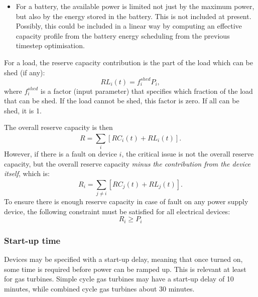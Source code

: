 \documentclass[12pt]{article}
\begin{document}
\begin{itemize}
\item \textcolor[HTML]{FF0000}{For a battery, the available power is limited not just by the maximum power, but also by the energy stored in the battery. This is not included at present. Possibly, this could be included in a linear way by computing an effective capacity profile from the battery energy scheduling from the previous timestep optimisation}.
\end{itemize}

For a load, the reserve capacity contribution is the part of the load which can be shed (if any):
\begin{equation}
	RL_{i} \left( t \right) = f_{i}^{shed}P_{i}, 
\end{equation}
where  \( f_{i}^{shed} \)  is a factor (input parameter) that specifies which fraction of the load that can be shed. 
If the load cannot be shed, this factor is zero. If all can be shed, it is 1.


The overall reserve capacity is then
\begin{equation}
	R=  \sum _{i}^{} \left[ RC_{i} \left( t \right) +RL_{i} \left( t \right)  \right] . 
\end{equation}
However, if there is a fault on device  $i$, the critical issue is not the overall reserve capacity, but the overall reserve capacity \emph{minus the contribution from the device itself}, which is:
\begin{equation}
 	R_{i}=  \sum _{j \neq i}^{} \left[ RC_{j}(t) +RL_{j}(t)  \right] . 
\end{equation}
To ensure there is enough reserve capacity in case of fault on any power supply device,  the following constraint must be satisfied for all electrical devices:
 \begin{equation}
 	R_{i} \geq P_{i} 
 \end{equation}
 
 
\subsubsection{Start-up time}

Devices may be specified with a start-up delay, meaning that once turned on, some time is required before power can be ramped up. This is relevant at least for gas turbines. 
Simple cycle gas turbines may have a start-up delay of 10 minutes, while combined cycle gas turbines about 30 minutes.
\end{document}
